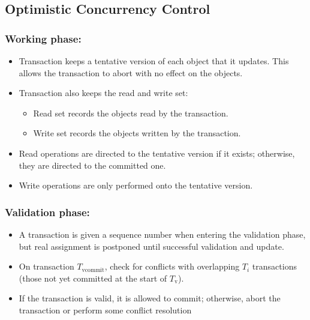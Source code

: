 \subsection{Optimistic Concurrency Control}
\subsubsection{Working phase:}
\begin{itemize}
\item Transaction keeps a tentative version of each object that it updates. This allows the transaction to abort with no effect on the objects.
\item Transaction also keeps the read and write set:
\begin{itemize}
\item Read set records the objects read by the transaction.
\item Write set records the objects written by the transaction.
\end{itemize}
\item Read operations are directed to the tentative version if it exists; otherwise, they are directed to the committed one.
\item Write operations are only performed onto the tentative version.
\end{itemize}

\subsubsection{Validation phase:}
\begin{itemize}
\item A transaction is given a sequence number when entering the validation phase, but real assignment is postponed until successful validation and update.
\item On transaction \( T_{\text{vcommit}} \), check for conflicts with overlapping \( T_i \) transactions (those not yet committed at the start of \( T_{\text{v}} \)).
\item If the transaction is valid, it is allowed to commit; otherwise, abort the transaction or perform some conflict resolution
\end{itemize}

